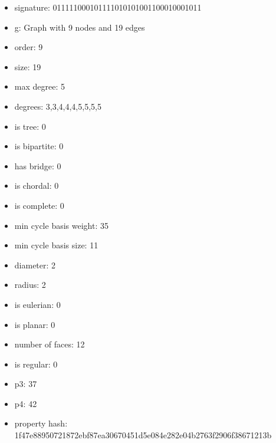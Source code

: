 \newpage
\begin{figure}
\end{figure}
\begin{itemize}
\item signature: 011111000101111010101001100010001011
\item g: Graph with 9 nodes and 19 edges
\item order: 9
\item size: 19
\item max degree: 5
\item degrees: 3,3,4,4,4,5,5,5,5
\item is tree: 0
\item is bipartite: 0
\item has bridge: 0
\item is chordal: 0
\item is complete: 0
\item min cycle basis weight: 35
\item min cycle basis size: 11
\item diameter: 2
\item radius: 2
\item is eulerian: 0
\item is planar: 0
\item number of faces: 12
\item is regular: 0
\item p3: 37
\item p4: 42
\item property hash: 1f47e88950721872ebf87ea30670451d5e084e282e04b2763f2906f38671213b
\end{itemize}
